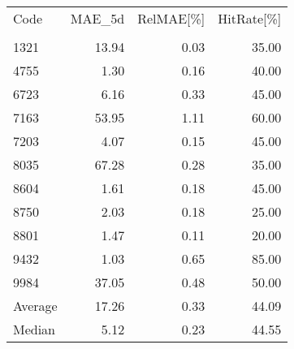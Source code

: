 \begingroup
\footnotesize
\begin{tabular}{lrrr}
\hline
Code & MAE\_5d & RelMAE[\%] & HitRate[\%] \\\\
\hline
1321 & 13.94 & 0.03 & 35.00 \\
4755 & 1.30 & 0.16 & 40.00 \\
6723 & 6.16 & 0.33 & 45.00 \\
7163 & 53.95 & 1.11 & 60.00 \\
7203 & 4.07 & 0.15 & 45.00 \\
8035 & 67.28 & 0.28 & 35.00 \\
8604 & 1.61 & 0.18 & 45.00 \\
8750 & 2.03 & 0.18 & 25.00 \\
8801 & 1.47 & 0.11 & 20.00 \\
9432 & 1.03 & 0.65 & 85.00 \\
9984 & 37.05 & 0.48 & 50.00 \\
Average & 17.26 & 0.33 & 44.09 \\
Median & 5.12 & 0.23 & 44.55 \\
\hline
\end{tabular}
\endgroup
